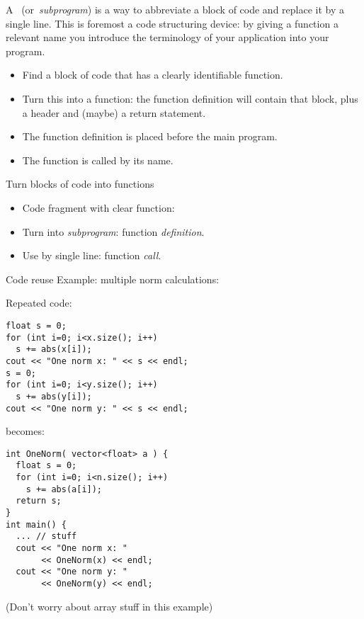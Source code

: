 
A~
(or~\emph{subprogram}) is a way to
abbreviate a block of code and replace it by a single line.
This is foremost a code structuring device: by giving a function a
relevant name you introduce the terminology of your application into
your program.

\begin{itemize}
\item Find a block of code that has a clearly identifiable function.
\item Turn this into a function: the function definition will contain
  that block, plus a header and (maybe) a return statement.
\item The function definition is placed before the main program.
\item The function is called by its name.
\end{itemize}

\begin{slide}{Turn blocks of code into functions}
  \label{sl:function-intro}
  \begin{itemize}
  \item Code fragment with clear function:
  \item Turn into \emph{subprogram}: function \emph{definition}.
  \item Use by single line: function \emph{call}.
  \end{itemize}
\end{slide}

\begin{block}{Code reuse}
  \label{sl:function-reuse}
Example: multiple norm calculations:
  \begin{multicols}{2}
    \small
    Repeated code:
\begin{lstlisting}
float s = 0;
for (int i=0; i<x.size(); i++)
  s += abs(x[i]);
cout << "One norm x: " << s << endl;
s = 0;
for (int i=0; i<y.size(); i++)
  s += abs(y[i]);
cout << "One norm y: " << s << endl;
\end{lstlisting}
\vfill\columnbreak
becomes:
\begin{lstlisting}
int OneNorm( vector<float> a ) {
  float s = 0;
  for (int i=0; i<n.size(); i++)
    s += abs(a[i]);
  return s;
}
int main() {
  ... // stuff
  cout << "One norm x: "
       << OneNorm(x) << endl;
  cout << "One norm y: " 
       << OneNorm(y) << endl;
\end{lstlisting}
  \end{multicols}
  (Don't worry about array stuff in this example)
\end{block}

